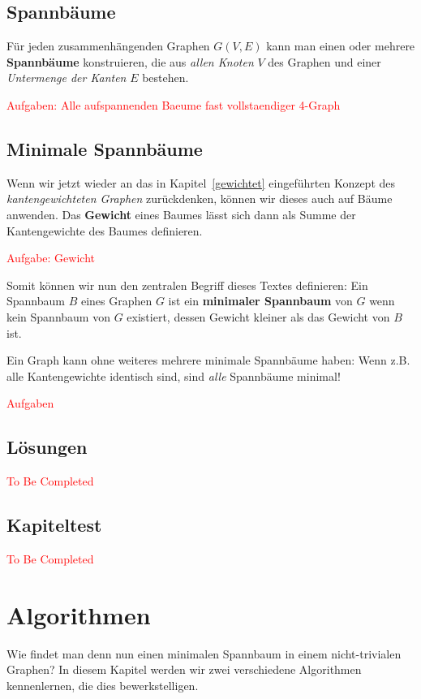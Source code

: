 \documentclass[12pt,a4paper]{report}
\theoremstyle{break}
\theoremstyle{plain}
\begin{document}
\section{Spannb\"{a}ume}

F\"ur jeden zusammenh\"{a}ngenden Graphen $G(V,E)$ kann man einen oder mehrere
\textbf{Spannb\"{a}ume} konstruieren, die aus \emph{allen Knoten} $V$ des
Graphen und einer \emph{Untermenge der Kanten} $E$ bestehen.

\textcolor{red}{Aufgaben: Alle aufspannenden Baeume fast vollstaendiger 4-Graph}

\section{Minimale Spannb\"{a}ume}

Wenn wir jetzt wieder an das in Kapitel~\ref{gewichtet}
eingef\"{u}hrten Konzept des \emph{kantengewichteten Graphen}
zur\"{u}ckdenken, k\"{o}nnen wir dieses auch auf B\"{a}ume
anwenden. Das \textbf{Gewicht} eines Baumes l\"{a}sst sich dann als
Summe der Kantengewichte des Baumes definieren.

\textcolor{red}{Aufgabe: Gewicht}

Somit k\"{o}nnen wir nun den zentralen Begriff dieses Textes
definieren: Ein Spannbaum $B$ eines Graphen $G$ ist ein
\textbf{minimaler Spannbaum} von $G$ wenn kein Spannbaum von $G$
existiert, dessen Gewicht kleiner als das Gewicht von $B$ ist.

Ein Graph kann ohne weiteres mehrere minimale Spannb\"{a}ume haben:
Wenn z.B. alle Kantengewichte identisch sind, sind \emph{alle}
Spannb\"{a}ume minimal!

\textcolor{red}{Aufgaben}

\section{L\"{o}sungen}
\textcolor{red}{To Be Completed}
\section{Kapiteltest}
\textcolor{red}{To Be Completed}

\chapter{Algorithmen}

Wie findet man denn nun einen minimalen Spannbaum in einem
nicht-trivialen Graphen? In diesem Kapitel werden wir zwei
verschiedene Algorithmen kennenlernen, die dies bewerkstelligen.
\end{document}
